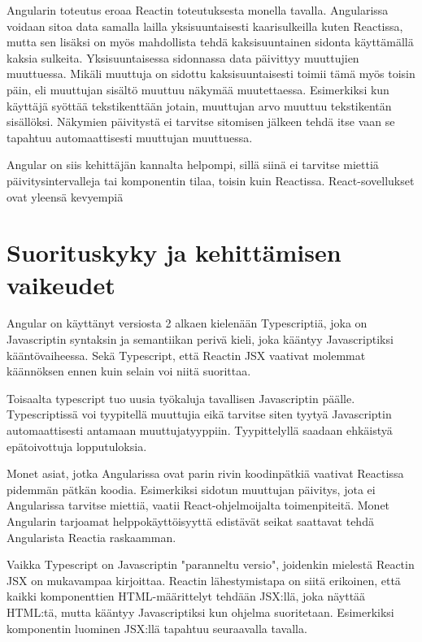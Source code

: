 \documentclass[a4paper,12pt,twoside]{article} %
\begin{document}
\vspace{4mm}\noindent
Angularin toteutus eroaa Reactin toteutuksesta monella tavalla. Angularissa voidaan sitoa data samalla lailla yksisuuntaisesti kaarisulkeilla kuten Reactissa, mutta sen lisäksi on myös mahdollista tehdä kaksisuuntainen sidonta käyttämällä kaksia sulkeita. Yksisuuntaisessa sidonnassa data päivittyy muuttujien muuttuessa. Mikäli muuttuja on sidottu kaksisuuntaisesti toimii tämä myös toisin päin, eli muuttujan sisältö muuttuu näkymää muutettaessa. Esimerkiksi kun käyttäjä syöttää tekstikenttään jotain, muuttujan arvo muuttuu tekstikentän sisällöksi. Näkymien päivitystä ei tarvitse sitomisen jälkeen tehdä itse vaan se tapahtuu automaattisesti muuttujan muuttuessa.

\vspace{4mm}\noindent
Angular on siis kehittäjän kannalta helpompi, sillä siinä ei tarvitse miettiä päivitysintervalleja tai komponentin tilaa, toisin kuin Reactissa. React-sovellukset ovat yleensä kevyempiä 


\newpage

\section{Suorituskyky ja kehittämisen vaikeudet}

Angular on käyttänyt versiosta 2 alkaen kielenään Typescriptiä, joka on Javascriptin syntaksin ja semantiikan perivä kieli, joka kääntyy Javascriptiksi kääntövaiheessa. Sekä Typescript, että Reactin JSX vaativat molemmat käännöksen ennen kuin selain voi niitä suorittaa.\cite{typescript}

\vspace{4mm}\noindent
Toisaalta typescript tuo uusia työkaluja tavallisen Javascriptin päälle. Typescriptissä voi tyypitellä muuttujia eikä tarvitse siten tyytyä Javascriptin automaattisesti antamaan muuttujatyyppiin. Tyypittelyllä saadaan ehkäistyä epätoivottuja lopputuloksia.

\vspace{4mm}\noindent
Monet asiat, jotka Angularissa ovat parin rivin koodinpätkiä vaativat Reactissa pidemmän pätkän koodia. Esimerkiksi sidotun muuttujan päivitys, jota ei Angularissa tarvitse miettiä, vaatii React-ohjelmoijalta toimenpiteitä. Monet Angularin tarjoamat helppokäyttöisyyttä edistävät seikat saattavat tehdä Angularista Reactia raskaamman.

\vspace{4mm}\noindent
Vaikka Typescript on Javascriptin "paranneltu versio", joidenkin mielestä Reactin JSX on mukavampaa kirjoittaa. Reactin lähestymistapa on siitä erikoinen, että kaikki komponenttien HTML-määrittelyt tehdään JSX:llä, joka näyttää HTML:tä, mutta kääntyy Javascriptiksi kun ohjelma suoritetaan. Esimerkiksi komponentin luominen JSX:llä tapahtuu seuraavalla tavalla.
\end{document}
